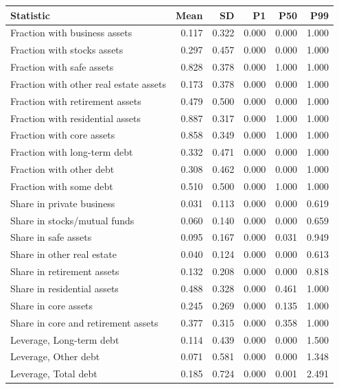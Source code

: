 \begin{tabular*}{\linewidth}{@{\extracolsep{\fill}}lrrrrr}\toprule
Statistic & Mean & SD & P1 & P50 & P99 \\
\midrule
Fraction with business assets & 0.117 & 0.322 & 0.000 & 0.000 & 1.000 \\
Fraction with stocks assets & 0.297 & 0.457 & 0.000 & 0.000 & 1.000 \\
Fraction with safe assets & 0.828 & 0.378 & 0.000 & 1.000 & 1.000 \\
Fraction with other real estate assets & 0.173 & 0.378 & 0.000 & 0.000 & 1.000 \\
Fraction with retirement assets & 0.479 & 0.500 & 0.000 & 0.000 & 1.000 \\
Fraction with residential assets & 0.887 & 0.317 & 0.000 & 1.000 & 1.000 \\
Fraction with core assets & 0.858 & 0.349 & 0.000 & 1.000 & 1.000 \\
Fraction with long-term debt & 0.332 & 0.471 & 0.000 & 0.000 & 1.000 \\
Fraction with other debt & 0.308 & 0.462 & 0.000 & 0.000 & 1.000 \\
Fraction with some debt & 0.510 & 0.500 & 0.000 & 1.000 & 1.000 \\
Share in private business & 0.031 & 0.113 & 0.000 & 0.000 & 0.619 \\
Share in stocks/mutual funds & 0.060 & 0.140 & 0.000 & 0.000 & 0.659 \\
Share in safe assets & 0.095 & 0.167 & 0.000 & 0.031 & 0.949 \\
Share in other real estate & 0.040 & 0.124 & 0.000 & 0.000 & 0.613 \\
Share in retirement assets & 0.132 & 0.208 & 0.000 & 0.000 & 0.818 \\
Share in residential assets & 0.488 & 0.328 & 0.000 & 0.461 & 1.000 \\
Share in core assets & 0.245 & 0.269 & 0.000 & 0.135 & 1.000 \\
Share in core and retirement assets & 0.377 & 0.315 & 0.000 & 0.358 & 1.000 \\
Leverage, Long-term debt & 0.114 & 0.439 & 0.000 & 0.000 & 1.500 \\
Leverage, Other debt & 0.071 & 0.581 & 0.000 & 0.000 & 1.348 \\
Leverage, Total debt & 0.185 & 0.724 & 0.000 & 0.001 & 2.491 \\
\bottomrule
\end{tabular*}
